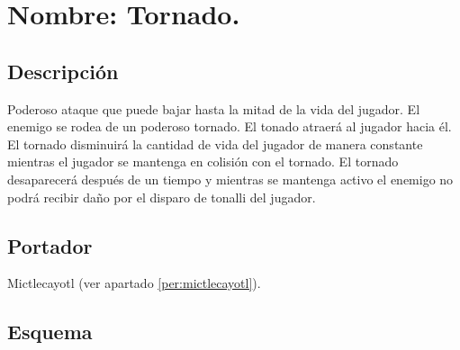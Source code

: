 \section{Nombre: Tornado.} \label{hab.tornado}
\subsection{Descripción}
Poderoso ataque que puede bajar hasta la mitad de la vida del jugador. El enemigo se rodea de un poderoso tornado. El tonado atraerá al jugador hacia él. El tornado disminuirá la cantidad de vida del jugador de manera constante mientras el jugador se mantenga en colisión con el tornado. El tornado desaparecerá después de un tiempo y mientras se mantenga activo el enemigo no podrá recibir daño por el disparo de tonalli del jugador.
\subsection{Portador}
Mictlecayotl (ver apartado \ref{per:mictlecayotl}).
\subsection{Esquema}
			